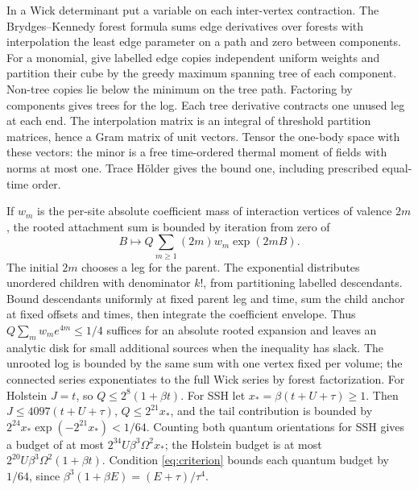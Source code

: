 \documentclass[11pt]{article}
\begin{document}
In a Wick determinant put a variable on each inter-vertex contraction. The Brydges--Kennedy forest formula \cite{bk} sums edge derivatives over forests with interpolation the least edge parameter on a path and zero between components. For a monomial, give labelled edge copies independent uniform weights and partition their cube by the greedy maximum spanning tree of each component. Non-tree copies lie below the minimum on the tree path. Factoring by components gives trees for the log. Each tree derivative contracts one unused leg at each end. The interpolation matrix is an integral of threshold partition matrices, hence a Gram matrix of unit vectors. Tensor the one-body space with these vectors: the minor is a free time-ordered thermal moment of fields with norms at most one. Trace H\"older gives the bound one, including prescribed equal-time order.

If $w_m$ is the per-site absolute coefficient mass of interaction vertices of valence $2m$, the rooted attachment sum is bounded by iteration from zero of
\[
 B\longmapsto Q\sum_{m\ge1}(2m)w_m\exp(2m B).
\]
The initial $2m$ chooses a leg for the parent. The exponential distributes unordered children with denominator $k!$, from partitioning labelled descendants. Bound descendants uniformly at fixed parent leg and time, sum the child anchor at fixed offsets and times, then integrate the coefficient envelope. Thus $Q\sum_m w_m e^{4m}\le1/4$ suffices for an absolute rooted expansion and leaves an analytic disk for small additional sources when the inequality has slack. The unrooted log is bounded by the same sum with one vertex fixed per volume; the connected series exponentiates to the full Wick series by forest factorization. For Holstein $J=t$, so $Q\le2^8(1+\beta t)$. For SSH let $x_*=\beta(t+U+\tau)\ge1$. Then $J\le4097(t+U+\tau)$, $Q\le2^{21}x_*$, and the tail contribution is bounded by $2^{24}x_*\exp(-2^{21}x_*)<1/64$. Counting both quantum orientations for SSH gives a budget of at most $2^{34}U\beta^3\Omega^2 x_*$; the Holstein budget is at most $2^{20}U\beta^3\Omega^2(1+\beta t)$. Condition \eqref{eq:criterion} bounds each quantum budget by $1/64$, since $\beta^3(1+\beta E)=(E+\tau)/\tau^4$.
\end{document}
